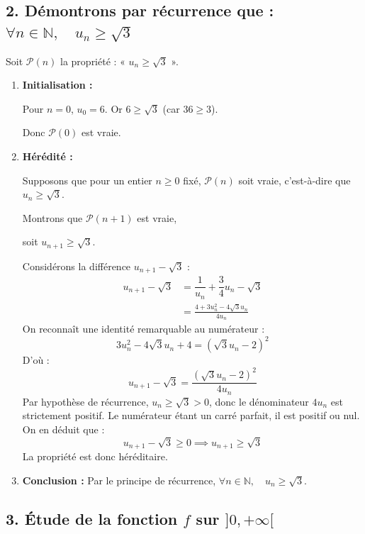 \documentclass[12pt,a4paper]{article}
\begin{document}
\subsection*{2. Démontrons par récurrence que : $\forall n \in \mathbb{N}, \quad u_n \ge \sqrt{3}$}
Soit $\mathcal{P}(n)$ la propriété : « $u_n \ge \sqrt{3}$ ».
\begin{enumerate}
    \item \textbf{Initialisation :} 
    
    Pour $n = 0$, $u_0 = 6$. Or $6 \ge \sqrt{3}$ (car $36 \ge 3$). 
    
    Donc $\mathcal{P}(0)$ est vraie.
    \item \textbf{Hérédité :} 
    
    Supposons que pour un entier $n \ge 0$ fixé, $\mathcal{P}(n)$ soit vraie, c'est-à-dire que $u_n \ge \sqrt{3}$. 
    
    Montrons que $\mathcal{P}(n+1)$ est vraie,
    
    soit $u_{n+1} \ge \sqrt{3}$.
    
    Considérons la différence $u_{n+1} - \sqrt{3}$ :
    \[
    \begin{aligned}
       u_{n+1} - \sqrt{3} &= \dfrac{1}{u_n} + \dfrac{3}{4}u_n - \sqrt{3}\\
        &= \frac{4 + 3u_n^2 - 4\sqrt{3}u_n}{4u_n}    
    \end{aligned} 
    \]
    On reconnaît une identité remarquable au numérateur :
    \[ 3u_n^2 - 4\sqrt{3}u_n + 4 = (\sqrt{3}u_n - 2)^2 \]
    D'où :
    \[ u_{n+1} - \sqrt{3} = \frac{(\sqrt{3}u_n - 2)^2}{4u_n} \]
    Par hypothèse de récurrence, $u_n \ge \sqrt{3} > 0$, donc le dénominateur $4u_n$ est strictement positif. Le numérateur étant un carré parfait, il est positif ou nul. On en déduit que :
    \[ u_{n+1} - \sqrt{3} \ge 0 \implies u_{n+1} \ge \sqrt{3} \]
    La propriété est donc héréditaire.
    \item \textbf{Conclusion :} Par le principe de récurrence, $\forall n \in \mathbb{N}, \quad u_n \ge \sqrt{3}$.
\end{enumerate}

\subsection*{3. Étude de la fonction $f$ sur $]0, +\infty[$}
\end{document}
